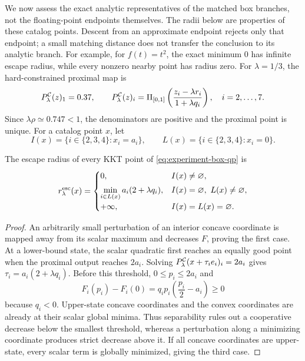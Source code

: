 We now assess the exact analytic representatives of the matched box
branches, not the floating-point endpoints themselves.  The radii below
are properties of these catalog points.  Descent from an approximate
endpoint rejects only that endpoint; a small matching distance does not
transfer the conclusion to its analytic branch.  For example, for
\(f(t)=t^2\), the exact minimum \(0\) has infinite escape radius, while
every nonzero nearby point has radius zero.
For \(\lambda=1/3\), the hard-constrained proximal map is
\begin{equation}
  P_\lambda^{\mathcal{C}}(z)_1=0.37,\qquad
  P_\lambda^{\mathcal{C}}(z)_i
  =\Pi_{[0,1]}\left(\frac{z_i-\lambda r_i}{1+\lambda q_i}\right),
  \quad i=2,\ldots,7.
  \label{eq:box-exact-prox}
\end{equation}
Since \(\lambda\rho\simeq0.747<1\), the denominators are positive and
the proximal point is unique.  For a catalog point \(x\), let
\[
  I(x)=\{i\in\{2,3,4\}:x_i=a_i\},\qquad
  L(x)=\{i\in\{2,3,4\}:x_i=0\}.
\]

\begin{proposition}
  \label{prop:box-exact-escape}
  The escape radius of every KKT point of
  \cref{eq:experiment-box-qp} is
  \begin{equation}
    r_{\lambda}^{\rm esc}(x)
    =
    \begin{cases}
      0,
        & I(x)\ne\varnothing,\\[1mm]
      \displaystyle\min_{i\in L(x)}a_i(2+\lambda q_i),
        & I(x)=\varnothing,\ L(x)\ne\varnothing,\\[2mm]
      +\infty,
        & I(x)=L(x)=\varnothing .
    \end{cases}
    \label{eq:box-exact-radius}
  \end{equation}
\end{proposition}

\begin{proof}
  An arbitrarily small perturbation of an interior concave coordinate is
  mapped away from its scalar maximum and decreases \(F\), proving the first
  case.  At a lower-bound state, the scalar quadratic first reaches an equally
  good point when the proximal output reaches \(2a_i\).  Solving
  \(P_\lambda^{\mathcal{C}}(x+\tau_i e_i)_i=2a_i\) gives
  \(\tau_i=a_i(2+\lambda q_i)\).  Before this threshold,
  \(0\le p_i\le2a_i\) and
  \[
    F_i(p_i)-F_i(0)
    =q_i p_i\left(\frac{p_i}{2}-a_i\right)\ge0
  \]
  because \(q_i<0\).  Upper-state concave coordinates and the convex
  coordinates are already at their scalar global minima.  Thus separability
  rules out a cooperative decrease below the smallest threshold, whereas a
  perturbation along a minimizing coordinate produces strict decrease above
  it.  If all concave coordinates are upper-state, every scalar term is
  globally minimized, giving the third case.
\end{proof}

